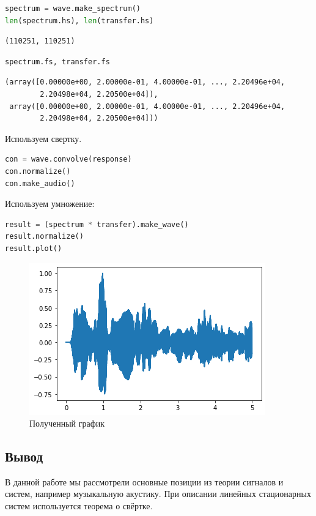 \begin{lstlisting}[language=Python]
spectrum = wave.make_spectrum()
len(spectrum.hs), len(transfer.hs)
\end{lstlisting}
\begin{lstlisting}
(110251, 110251)
\end{lstlisting}

\begin{lstlisting}[language=Python]
spectrum.fs, transfer.fs
\end{lstlisting}
\begin{lstlisting}
(array([0.00000e+00, 2.00000e-01, 4.00000e-01, ..., 2.20496e+04,
        2.20498e+04, 2.20500e+04]),
 array([0.00000e+00, 2.00000e-01, 4.00000e-01, ..., 2.20496e+04,
        2.20498e+04, 2.20500e+04]))
\end{lstlisting}

Используем свертку.

\begin{lstlisting}[language=Python]
con = wave.convolve(response)
con.normalize()
con.make_audio()
\end{lstlisting}

Используем умножение:
\begin{lstlisting}[language=Python]
result = (spectrum * transfer).make_wave()
result.normalize()
result.plot()
\end{lstlisting}

\begin{figure}[H]
	\begin{center}
		\includegraphics[scale=1]{fig/lab10/lab10_7.png}
		\caption{Полученный график}
	\end{center}
\end{figure}

\subsection{Вывод}

В данной работе мы рассмотрели основные позиции из теории сигналов и систем, например музыкальную акустику. При описании линейных стационарных систем используется теорема о свёртке.
